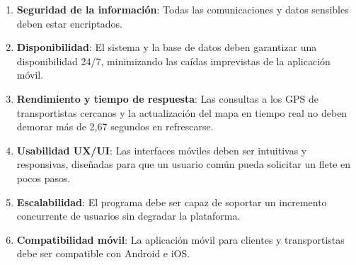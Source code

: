  \begin{enumerate}
 	\item \textbf{Seguridad de la información}: Todas las comunicaciones y datos sensibles deben estar encriptados.
 	\item \textbf{Disponibilidad}: El sistema y la base de datos deben garantizar una disponibilidad 24/7, minimizando las caídas imprevistas de la aplicación móvil.
 	\item \textbf{Rendimiento y tiempo de respuesta}: Las consultas a los GPS de transportistas cercanos y la actualización del mapa en tiempo real no deben demorar más de 2,67 segundos en refrescarse.
 	\item \textbf{Usabilidad UX/UI}: Las interfaces móviles deben ser intuitivas y responsivas, diseñadas para que un usuario común pueda solicitar un flete en pocos pasos.
 	\item \textbf{Escalabilidad}: El programa debe ser capaz de soportar un incremento concurrente de usuarios sin degradar la plataforma.
 	\item \textbf{Compatibilidad móvil}: La aplicación móvil para clientes y transportistas debe ser compatible con Android e iOS.
 \end{enumerate}